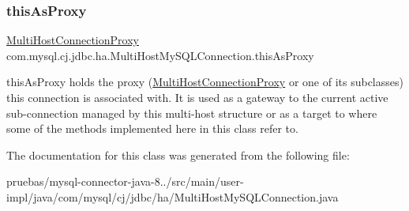 \subsubsection{\texorpdfstring{this\+As\+Proxy}{thisAsProxy}}
{\footnotesize\ttfamily \mbox{\hyperlink{classcom_1_1mysql_1_1cj_1_1jdbc_1_1ha_1_1_multi_host_connection_proxy}{Multi\+Host\+Connection\+Proxy}} com.\+mysql.\+cj.\+jdbc.\+ha.\+Multi\+Host\+My\+S\+Q\+L\+Connection.\+this\+As\+Proxy\hspace{0.3cm}{\ttfamily [protected]}}

this\+As\+Proxy holds the proxy (\mbox{\hyperlink{classcom_1_1mysql_1_1cj_1_1jdbc_1_1ha_1_1_multi_host_connection_proxy}{Multi\+Host\+Connection\+Proxy}} or one of its subclasses) this connection is associated with. It is used as a gateway to the current active sub-\/connection managed by this multi-\/host structure or as a target to where some of the methods implemented here in this class refer to. 

The documentation for this class was generated from the following file\+:\begin{DoxyCompactItemize}
\item 
pruebas/mysql-\/connector-\/java-\/8../src/main/user-\/impl/java/com/mysql/cj/jdbc/ha/Multi\+Host\+My\+S\+Q\+L\+Connection.\+java\end{DoxyCompactItemize}
